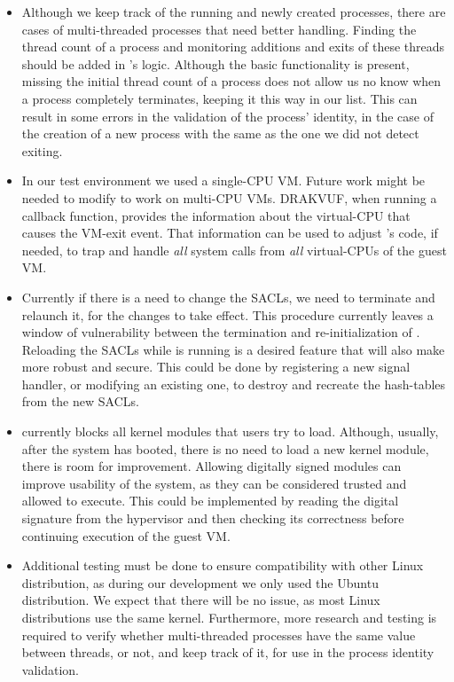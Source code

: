 \begin{itemize}

\item Although we keep track of the running and newly created processes, there are cases of multi-threaded processes that need better handling. Finding the thread count of a process and monitoring additions and exits of these threads should be added in 's logic. Although the basic functionality is present, missing the initial thread count of a process does not allow us no know when a process completely terminates, keeping it this way in our list. This can result in some errors in the validation of the process' identity, in the case of the creation of a new process with the same  as the one we did not detect exiting.  

\item In our test environment we used a single-\ac{CPU} \ac{VM}. Future work might be needed to modify  to work on multi-\ac{CPU} \acp{VM}. DRAKVUF, when running a callback function, provides the information about the virtual-\ac{CPU} that causes the \ac{VM}-exit event. That information can be used to adjust 's code, if needed, to trap and handle \emph{all} system calls from \emph{all} virtual-\acp{CPU} of the guest \ac{VM}.

\item Currently if there is a need to change the \acp{SACL}, we need to terminate  and relaunch it, for the changes to take effect. This procedure currently leaves a window of vulnerability between the termination and re-initialization of . Reloading the \acp{SACL} while  is running is a desired feature that will also make  more robust and secure. This could be done by registering a new signal handler, or modifying an existing one, to destroy and recreate the hash-tables from the new \acp{SACL}.

\item {} currently blocks all kernel modules that users try to load. Although, usually, after the system has booted, there is no need to load a new kernel module, there is room for improvement. Allowing digitally signed modules can improve usability of the system, as they can be considered trusted and allowed to execute. This could be implemented by reading the digital signature from the hypervisor and then checking its correctness before continuing execution of the guest \ac{VM}.

\item Additional testing must be done to ensure compatibility with other Linux distribution, as during our development we only used the Ubuntu distribution. We expect that there will be no issue, as most Linux distributions use the same kernel.
Furthermore, more research and testing is required to verify whether multi-threaded processes have the same  value between threads, or not, and keep track of it, for use in the process identity validation.


\end{itemize}

